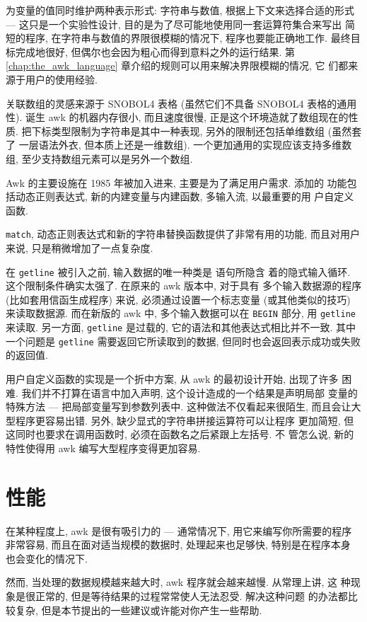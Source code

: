 为变量的值同时维护两种表示形式: 字符串与数值, 根据上下文来选择合适的形式
--- 这只是一个实验性设计, 目的是为了尽可能地使用同一套运算符集合来写出
简短的程序, 在字符串与数值的界限很模糊的情况下, 程序也要能正确地工作.
最终目标完成地很好, 但偶尔也会因为粗心而得到意料之外的运行结果. 第 
\ref{chap:the_awk_language} 章介绍的规则可以用来解决界限模糊的情况, 它
们都来源于用户的使用经验.

关联数组的灵感来源于 SNOBOL4 表格 (虽然它们不具备 SNOBOL4 表格的通用性).
诞生 awk 的机器内存很小, 而且速度很慢, 正是这个环境造就了数组现在的性质.
把下标类型限制为字符串是其中一种表现, 另外的限制还包括单维数组 (虽然套了
一层语法外衣, 但本质上还是一维数组). 一个更加通用的实现应该支持多维数组,
至少支持数组元素可以是另外一个数组.

Awk 的主要设施在 1985 年被加入进来, 主要是为了满足用户需求. 添加的
功能包括动态正则表达式, 新的内建变量与内建函数, 多输入流, 以最重要的用
户自定义函数.

\texttt{match}, 动态正则表达式和新的字符串替换函数提供了非常有用的功能,
而且对用户来说, 只是稍微增加了一点复杂度.

在 \texttt{getline} 被引入之前, 输入数据的唯一种类是 \patact 语句所隐含
着的隐式输入循环. 这个限制条件确实太强了. 在原来的 awk 版本中, 对于具有
多个输入数据源的程序 (比如套用信函生成程序) 来说, 必须通过设置一个标志变量
(或其他类似的技巧) 来读取数据源. 而在新版的 awk 中, 多个输入数据可以在
\texttt{BEGIN} 部分, 用 \texttt{getline} 来读取. 另一方面, \texttt{getline}
是过载的, 它的语法和其他表达式相比并不一致. 其中一个问题是 \texttt{getline}
需要返回它所读取到的数据, 但同时也会返回表示成功或失败的返回值.

用户自定义函数的实现是一个折中方案, 从 awk 的最初设计开始, 出现了许多
困难. 我们并不打算在语言中加入声明, 这个设计造成的一个结果是声明局部
变量的特殊方法 --- 把局部变量写到参数列表中. 这种做法不仅看起来很陌生,
而且会让大型程序更容易出错. 另外, 缺少显式的字符串拼接运算符可以让程序
更加简短, 但这同时也要求在调用函数时, 必须在函数名之后紧跟上左括号. 不
管怎么说, 新的特性使得用 awk 编写大型程序变得更加容易.

\section{性能}
\label{sec:performance}
在某种程度上, awk 是很有吸引力的 --- 通常情况下, 用它来编写你所需要的程序
非常容易, 而且在面对适当规模的数据时, 处理起来也足够快, 特别是在程序本身
也会变化的情况下.

然而, 当处理的数据规模越来越大时, awk 程序就会越来越慢. 从常理上讲, 这
种现象是很正常的, 但是等待结果的过程常常使人无法忍受. 解决这种问题
的办法都比较复杂, 但是本节提出的一些建议或许能对你产生一些帮助.

